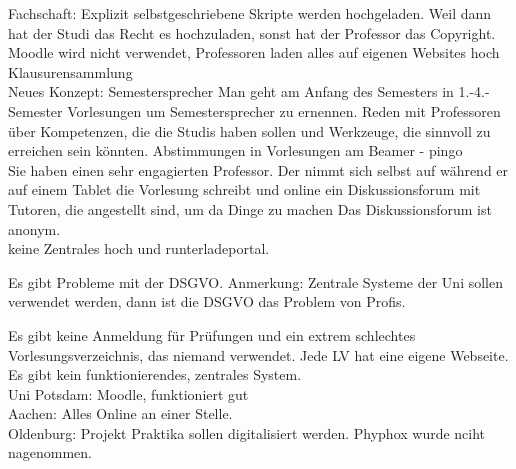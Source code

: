 \begin{itemize}
{\begin{itemize}
			Fachschaft:
			Explizit selbstgeschriebene Skripte werden hochgeladen. Weil dann hat der Studi das Recht es hochzuladen, sonst hat der Professor das Copyright.\\

			Moodle wird nicht verwendet, Professoren laden alles auf eigenen Websites hoch
			Klausurensammlung\\

			Neues Konzept:
			Semestersprecher
			Man geht am Anfang des Semesters in 1.-4.-Semester Vorlesungen um Semestersprecher zu ernennen.
			Reden mit Professoren über Kompetenzen, die die Studis haben sollen und Werkzeuge, die sinnvoll zu erreichen sein könnten.
			Abstimmungen in Vorlesungen am Beamer - pingo \\

			Sie haben einen sehr engagierten Professor.
			Der nimmt sich selbst auf während er auf einem Tablet die Vorlesung schreibt
			und online ein Diskussionsforum mit Tutoren, die angestellt sind, um da Dinge zu machen
			Das Diskussionsforum ist anonym. \\

			keine Zentrales hoch und runterladeportal.

			Es gibt Probleme mit der DSGVO.
			Anmerkung: Zentrale Systeme der Uni sollen verwendet werden, dann ist die DSGVO das Problem von Profis.

			Es gibt keine Anmeldung für Prüfungen und ein extrem schlechtes Vorlesungsverzeichnis, das niemand verwendet. Jede LV hat eine eigene Webseite. Es gibt kein funktionierendes, zentrales System.
 \\
Uni Potsdam: Moodle, funktioniert gut
 \\
Aachen: Alles Online an einer Stelle.
 \\
Oldenburg: Projekt Praktika sollen digitalisiert werden. Phyphox wurde nciht nagenommen.


\end{itemize}}
\end{itemize}
